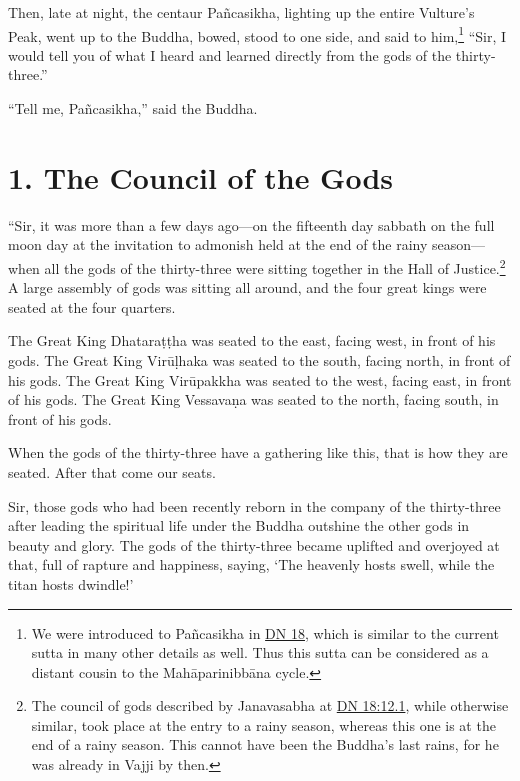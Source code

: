\documentclass[12pt,openany]{book}%
\begin{document}
Then, late at night, the centaur \textsanskrit{Pañcasikha}, lighting up the entire Vulture’s Peak, went up to the Buddha, bowed, stood to one side, and said to him,\footnote{We were introduced to \textsanskrit{Pañcasikha} in \href{https://suttacentral.net/dn18/en/sujato}{DN 18}, which is similar to the current sutta in many other details as well. Thus this sutta can be considered as a distant cousin to the \textsanskrit{Mahāparinibbāna} cycle. } “Sir, I would tell you of what I heard and learned directly from the gods of the thirty-three.” 

“Tell me, \textsanskrit{Pañcasikha},” said the Buddha. 

\section*{1. The Council of the Gods }

“Sir, it was more than a few days ago—on the fifteenth day sabbath on the full moon day at the invitation to admonish held at the end of the rainy season—when all the gods of the thirty-three were sitting together in the Hall of Justice.\footnote{The council of gods described by Janavasabha at \href{https://suttacentral.net/dn18/en/sujato\#12.1}{DN 18:12.1}, while otherwise similar, took place at the entry to a rainy season, whereas this one is at the end of a rainy season. This cannot have been the Buddha’s last rains, for he was already in Vajji by then. } A large assembly of gods was sitting all around, and the four great kings were seated at the four quarters. 

The Great King \textsanskrit{Dhataraṭṭha} was seated to the east, facing west, in front of his gods. The Great King \textsanskrit{Virūḷhaka} was seated to the south, facing north, in front of his gods. The Great King \textsanskrit{Virūpakkha} was seated to the west, facing east, in front of his gods. The Great King \textsanskrit{Vessavaṇa} was seated to the north, facing south, in front of his gods. 

When the gods of the thirty-three have a gathering like this, that is how they are seated. After that come our seats. 

Sir, those gods who had been recently reborn in the company of the thirty-three after leading the spiritual life under the Buddha outshine the other gods in beauty and glory. The gods of the thirty-three became uplifted and overjoyed at that, full of rapture and happiness, saying, ‘The heavenly hosts swell, while the titan hosts dwindle!’ 
\end{document}
